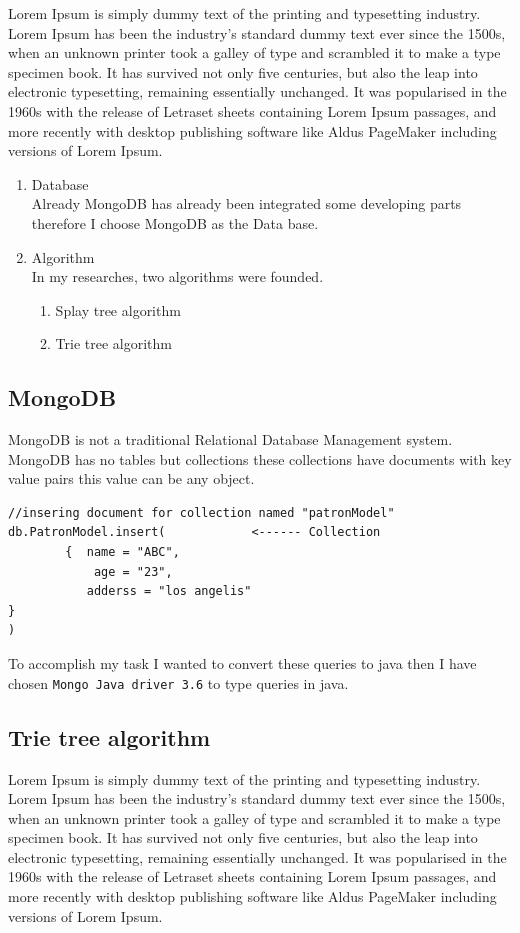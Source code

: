 \documentclass[12pt,a4paper]{report}
\begin{document}
Lorem Ipsum is simply dummy text of the printing and typesetting industry. Lorem Ipsum has been the industry's standard dummy text ever since the 1500s, when an unknown printer took a galley of type and scrambled it to make a type specimen book. It has survived not only five centuries, but also the leap into electronic typesetting, remaining essentially unchanged. It was popularised in the 1960s with the release of Letraset sheets containing Lorem Ipsum passages, and more recently with desktop publishing software like Aldus PageMaker including versions of Lorem Ipsum.
\begin{enumerate}
\item Database \\
Already MongoDB has already been integrated some developing parts therefore I  choose MongoDB as the Data base.
\item Algorithm\\
In my researches, two algorithms were founded. 
\begin{enumerate}
\item Splay tree algorithm
\item Trie tree algorithm
\end{enumerate}
\end{enumerate}

\subsection*{MongoDB}

MongoDB is not a traditional Relational Database Management system. MongoDB has no tables but collections these collections have documents with key value pairs this value can be any object. 

\begin{lstlisting}
//insering document for collection named "patronModel"
db.PatronModel.insert(            <------ Collection
        {  name = "ABC",
            age = "23",
           adderss = "los angelis"
}
)
\end{lstlisting}

To accomplish my task I wanted to convert these queries to java then I have chosen \texttt{Mongo Java driver 3.6}\cite{mongojavadriver} to type queries in java. 

\subsection*{Trie tree algorithm}
Lorem Ipsum is simply dummy text of the printing and typesetting industry. Lorem Ipsum has been the industry's standard dummy text ever since the 1500s, when an unknown printer took a galley of type and scrambled it to make a type specimen book. It has survived not only five centuries, but also the leap into electronic typesetting, remaining essentially unchanged. It was popularised in the 1960s with the release of Letraset sheets containing Lorem Ipsum passages, and more recently with desktop publishing software like Aldus PageMaker including versions of Lorem Ipsum.
\end{document}
